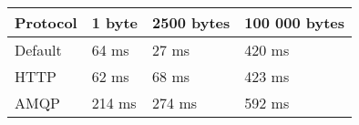 \begin{tabularx}{\textwidth}{llll}
\hline
 Protocol   & 1 byte   & 2500 bytes   & 100 000 bytes   \\
\hline
 Default    & 64 ms    & 27 ms        & 420 ms          \\
 HTTP       & 62 ms    & 68 ms        & 423 ms          \\
 AMQP       & 214 ms   & 274 ms       & 592 ms          \\
\hline
\end{tabularx}